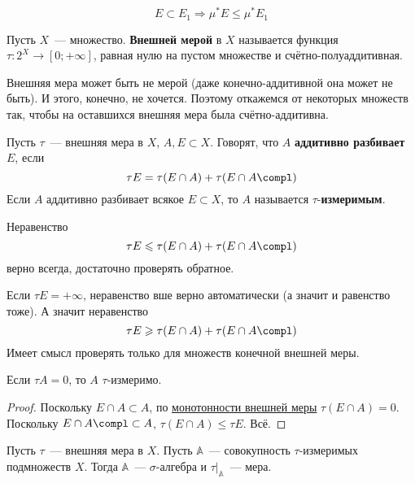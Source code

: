 \documentclass{article}
\begin{document}
    \begin{corollary}
        \label{Монотонность внешней меры}
        $$
        E\subset E_1\Rightarrow\mu^*E\leqslant\mu^* E_1
        $$
    \end{corollary}
    \begin{definition}
        Пусть $X$~--- множество. \textbf{Внешней мерой} в $X$ называется функция $\tau\colon 2^X\to[0;+\infty]$, равная нулю на пустом множестве и счётно-полуаддитивная.
    \end{definition}
    \begin{remark}
        Внешняя мера может быть не мерой (даже конечно-аддитивной она может не быть). И этого, конечно, не хочется. Поэтому откажемся от некоторых множеств так, чтобы на оставшихся внешняя мера была счётно-аддитивна.
    \end{remark}
    \begin{definition}
        Пусть $\tau$~--- внешняя мера в $X$, $A,E\subset X$. Говорят, что $A$ \textbf{аддитивно разбивает} $E$, если
        $$
        \tau E=\tau(E\cap A)+\tau(E\cap A\compl)
        $$
        Если $A$ аддитивно разбивает всякое $E\subset X$, то $A$ называется $\tau$-\textbf{измеримым}.
    \end{definition}
    \begin{remark}
        Неравенство
        $$
        \tau E\leqslant\tau(E\cap A)+\tau(E\cap A\compl)
        $$
        верно всегда, достаточно проверять обратное.
    \end{remark}
    \begin{remark}
        Если $\tau E=+\infty$, неравенство вше верно автоматически (а значит и равенство тоже). А значит неравенство
        $$
        \tau E\geqslant\tau(E\cap A)+\tau(E\cap A\compl)
        $$
        Имеет смысл проверять только для множеств конечной внешней меры.
    \end{remark}
    \begin{claim}
        Если $\tau A=0$, то $A$ $\tau$-измеримо.
    \end{claim}
    \begin{proof}
        Поскольку $E\cap A\subset A$, по \hyperref[Монотонность внешней меры]{монотонности внешней меры} $\tau(E\cap A)=0$.\\
        Поскольку $E\cap A\compl\subset A$, $\tau(E\cap A)\leqslant\tau E$. Всё.
    \end{proof}
    \begin{theorem}
        Пусть $\tau$~--- внешняя мера в $X$. Пусть $\mathbb A$~--- совокупность $\tau$-измеримых подмножеств $X$. Тогда $\mathbb A$~--- $\sigma$-алгебра и $\tau\big|_{\mathbb A}$~--- мера.
    \end{theorem}
\end{document}

